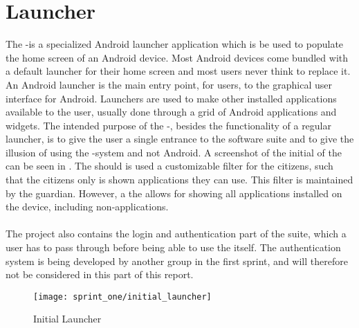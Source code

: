 
\section{Launcher}
The \giraf-\launcher is a specialized Android launcher application which is be used to populate the home screen of an Android device. Most Android devices come bundled with a default launcher for their home screen and most users never think to replace it. An Android launcher is the main entry point, for users, to the graphical user interface for Android. Launchers are used to make other installed applications available to the user, usually done through a grid of Android applications and widgets. The intended purpose of the \giraf-\launcher, besides the functionality of a regular launcher, is to give the user a single entrance to the \giraf software suite and to give the illusion of using the \giraf-system and not Android. A screenshot of the initial  of the \launcher can be seen in . The \launcher should is used a customizable filter for the citizens, such that the citizens only is shown applications they can use. This filter is maintained by the guardian. However, a the \launcher allows for showing all applications installed on the device, including non-\giraf applications. 
\\\\
The \launcher project also contains the login and authentication part of the \giraf suite, which a user has to pass through before being able to use the \launcher itself. The authentication system is being developed by another group in the first sprint, and will therefore not be considered in this part of this report. 

\begin{figure}[!htbp]
	\centering
	\texttt{[image: sprint\_one/initial\_launcher]}
	\caption{Initial Launcher}
	\label{fig:initial_launcher}
\end{figure}
